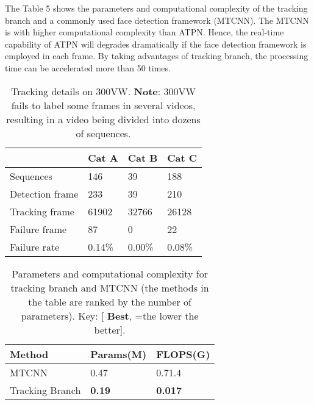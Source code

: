 \documentclass[3p,twocolumn, round, sort & compress]{elsarticle}
\begin{document}
The Table 5 shows the parameters and computational complexity of the tracking branch and a commonly used face detection framework (MTCNN). The MTCNN is with  higher computational complexity than ATPN. Hence, the real-time capability of ATPN will degrades dramatically if the face detection framework is employed in each frame. By taking advantages of tracking branch, the processing time can be accelerated more than 50 times.


\begin{table}[t!]
	\centering
	\begin{tabular}{|l|l|l|l|}
		\hline
		& Cat A & Cat B & Cat C \\ \hline
		Sequences       & 146        & 39         & 188        \\ \hline
		Detection frame & 233        & 39         & 210        \\ \hline
		Tracking frame  & 61902      & 32766      & 26128      \\ \hline
		Failure frame   & 87         & 0          & 22         \\ \hline
		Failure rate    & 0.14\%     & 0.00\%     & 0.08\%     \\ \hline
	\end{tabular}
	\caption{Tracking details on 300VW. \textbf{Note}: 300VW fails to label some frames in several videos, resulting in a video being divided into dozens of sequences.}
	\label{Tabal4}
\end{table}

\begin{table}[t!]
	\centering
	\begin{tabular}{m{3.0cm}<{\centering}m{1.6cm}<{\centering}m{1.6cm}<{\centering}}
		\hline
		Method          & Params(M) & FLOPS(G) \\ \hline
		MTCNN \citep{MTCNN}   & 0.47  & 0.71.4  \\ 
		Tracking Branch & {\color{red} \textbf{0.19}} & {\color{red} \textbf{0.017}}    \\ \hline
	\end{tabular}
	\caption{Parameters and computational complexity for tracking branch and MTCNN (the methods in the table are ranked by the number of parameters). Key: [{\color{red} \textbf{Best}}, =the lower the better].}
	\label{Tabal5}
\end{table}
\end{document}
